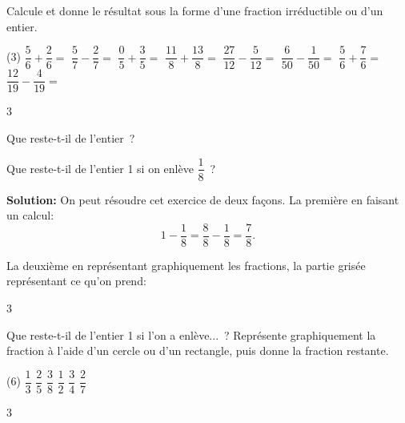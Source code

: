 \documentclass[a4paper,11pt]{report}
\begin{document}
\begin{exo}
{Calcule et donne le résultat sous la forme d'une fraction irréductible ou d'un entier. 
\begin{tasks}(3)
\task $\dfrac{5}{6}+\dfrac{2}{6}= $ 
 \task $\dfrac{5}{7}-\dfrac{2}{7}=$ 
 \task $\dfrac{0}{5}+\dfrac{3}{5}=$
 \task $\dfrac{11}{8}+\dfrac{13}{8}=$
 \task $\dfrac{27}{12}-\dfrac{5}{12}=$
 \task $\dfrac{6}{50}-\dfrac{1}{50}=$
 \task $\dfrac{5}{6}+\dfrac{7}{6}=$
 \task $\dfrac{12}{19}-\dfrac{4}{19}=$\\ 
\end{tasks}
}{3}
\end{exo}

\begin{resolu}{Que reste-t-il de l'entier~?}{

Que reste-t-il de l'entier 1 si on enlève $\dfrac{1}{8}$~?

{\bfseries Solution:} On peut résoudre cet exercice de deux façons. La première en faisant un calcul:
\[1-\dfrac{1}{8}=\dfrac{8}{8}-\dfrac{1}{8}=\dfrac{7}{8}.\]

La deuxième en représentant graphiquement les fractions, la partie grisée représentant ce qu'on prend:
\begin{center}
\end{center}
}
{3}
\end{resolu}

\begin{exo}
{Que reste-t-il de l'entier 1 si l'on a enlève...~?
Représente graphiquement la fraction à l'aide d'un cercle ou d'un rectangle, puis donne la fraction restante.

\begin{tasks}(6)
\task $\dfrac{1}{3}$
\task $\dfrac{2}{5}$
\task $\dfrac{3}{8}$
\task $\dfrac{1}{2}$
\task $\dfrac{3}{4}$
\task $\dfrac{2}{7}$
\end{tasks}}
{3}
\end{exo}
\end{document}
